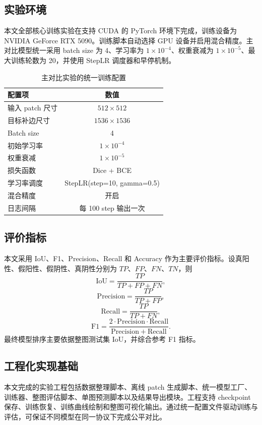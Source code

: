 \documentclass[12pt,a4paper]{ctexart}
\begin{document}
\subsection{实验环境}
本文全部核心训练实验在支持 CUDA 的 PyTorch 环境下完成，训练设备为 NVIDIA GeForce RTX 5090。训练脚本自动选择 GPU 设备并启用混合精度。主对比模型统一采用 batch size 为 4、学习率为 $1 \times 10^{-4}$、权重衰减为 $1 \times 10^{-5}$、最大训练轮数为 20，并使用 StepLR 调度器和早停机制。

\begin{table}[htbp]
\centering
\caption{主对比实验的统一训练配置}
\begin{tabular}{lc}
\toprule
配置项 & 数值 \\
\midrule
输入 patch 尺寸 & $512 \times 512$ \\
目标补边尺寸 & $1536 \times 1536$ \\
Batch size & 4 \\
初始学习率 & $1 \times 10^{-4}$ \\
权重衰减 & $1 \times 10^{-5}$ \\
损失函数 & Dice + BCE \\
学习率调度 & StepLR(step=10, gamma=0.5) \\
混合精度 & 开启 \\
日志间隔 & 每 100 step 输出一次 \\
\bottomrule
\end{tabular}
\end{table}

\subsection{评价指标}
本文采用 IoU、F1、Precision、Recall 和 Accuracy 作为主要评价指标。设真阳性、假阳性、假阴性、真阴性分别为 $TP$、$FP$、$FN$、$TN$，则
\[
\mathrm{IoU} = \frac{TP}{TP + FP + FN},
\]
\[
\mathrm{Precision} = \frac{TP}{TP + FP},
\]
\[
\mathrm{Recall} = \frac{TP}{TP + FN},
\]
\[
\mathrm{F1} = \frac{2 \cdot \mathrm{Precision} \cdot \mathrm{Recall}}{\mathrm{Precision} + \mathrm{Recall}}.
\]
最终模型排序主要依据整图测试集 IoU，并综合参考 F1 指标。

\subsection{工程化实现基础}
本文完成的实验工程包括数据整理脚本、离线 patch 生成脚本、统一模型工厂、训练器、整图评估脚本、单图预测脚本以及结果导出模块。工程支持 checkpoint 保存、训练恢复、训练曲线绘制和整图可视化输出。通过统一配置文件驱动训练与评估，可保证不同模型在同一协议下完成公平对比。
\end{document}
